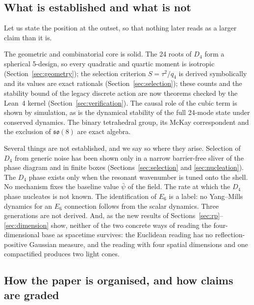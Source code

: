 \documentclass[a4paper,11pt]{article}
\numberwithin{equation}{section}
\theoremstyle{jsplain}
\theoremstyle{jsrem}
\begin{document}
\subsection{What is established and what is not}

Let us state the position at the outset, so that nothing later reads as a larger claim than it is.

The geometric and combinatorial core is solid. The 24 roots of $D_4$ form a spherical 5-design, so every quadratic and quartic moment is isotropic (Section~\ref{sec:geometry}); the selection criterion $S=\tau^2/q_4$ is derived symbolically and its values are exact rationals (Section~\ref{sec:selection}); these counts and the stability bound of the legacy discrete action are now theorems checked by the Lean~4 kernel (Section~\ref{sec:verification}). The causal role of the cubic term is shown by simulation, as is the dynamical stability of the full 24-mode state under conserved dynamics. The binary tetrahedral group, its McKay correspondent and the exclusion of $\mathfrak{so}(8)$ are exact algebra.

Several things are not established, and we say so where they arise. Selection of $D_4$ from generic noise has been shown only in a narrow barrier-free sliver of the phase diagram and in finite boxes (Sections~\ref{sec:selection} and \ref{sec:nucleation}). The $D_4$ phase exists only when the resonant wavenumber is tuned onto the shell. No mechanism fixes the baseline value $\bar\psi$ of the field. The rate at which the $D_4$ phase nucleates is not known. The identification of $E_6$ is a label: no Yang--Mills dynamics for an $E_6$ connection follows from the scalar dynamics. Three generations are not derived. And, as the new results of Sections~\ref{sec:rp}--\ref{sec:dimension} show, neither of the two concrete ways of reading the four-dimensional base as spacetime survives: the Euclidean reading has no reflection-positive Gaussian measure, and the reading with four spatial dimensions and one compactified produces two light cones.

\subsection{How the paper is organised, and how claims are graded}
\end{document}
